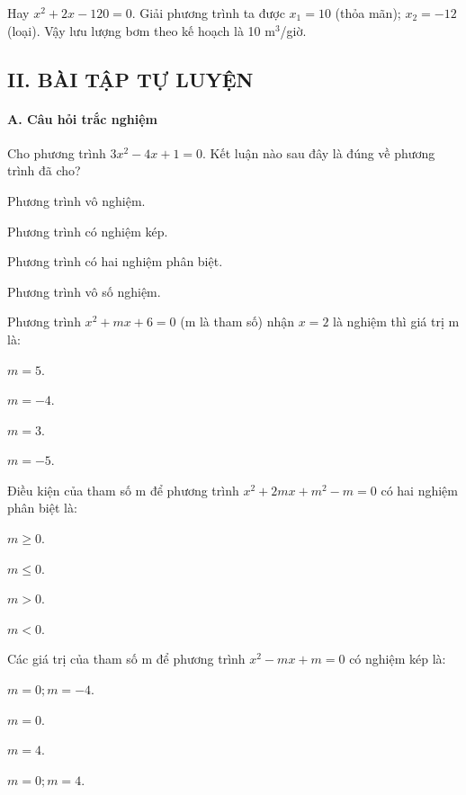 \documentclass[%
    fontsize=12pt,%
    chapterprefix=false,%
    open=right,%
    twoside=false,%
    numbers=noenddot,%
    headings=optiontohead,%
    final,%
    DIV=15,%
    parskip=half %
]{scrbook}
\begin{document}
Hay $ x^2 + 2x - 120 = 0 $. Giải phương trình ta được $ x_1 = 10 $ (thỏa mãn); $ x_2 = -12 $ (loại). Vậy lưu lượng bơm theo kế hoạch là 10 m$^3$/giờ.
\subsection{II. BÀI TẬP TỰ LUYỆN}
\paragraph{A. Câu hỏi trắc nghiệm}

\begin{tracnghiem}

\item Cho phương trình $ 3x^2 - 4x + 1 = 0 $. Kết luận nào sau đây là đúng về phương trình đã cho?
\begin{options}
  \item Phương trình vô nghiệm.
  \item Phương trình có nghiệm kép.
  \item Phương trình có hai nghiệm phân biệt.
  \item Phương trình vô số nghiệm.
\end{options}

\item Phương trình $ x^2 + mx + 6 = 0 $ (m là tham số) nhận $ x = 2 $ là nghiệm thì giá trị m là:
\begin{options}
  \item $ m = 5 $.
  \item $ m = -4 $.
  \item $ m = 3 $.
  \item $ m = -5 $.
\end{options}

\item Điều kiện của tham số m để phương trình $ x^2 + 2mx + m^2 - m = 0 $ có hai nghiệm phân biệt là:
\begin{options}
  \item $ m \geq 0. $
  \item $ m \leq 0. $
  \item $ m > 0. $
  \item $ m < 0. $
\end{options}

\item Các giá trị của tham số m để phương trình $ x^2 - mx + m = 0 $ có nghiệm kép là:
\begin{options}
  \item $ m = 0; m = -4. $
  \item $ m = 0. $
  \item $ m = 4. $
  \item $ m = 0; m = 4. $
\end{options}


\end{tracnghiem}
\end{document}
